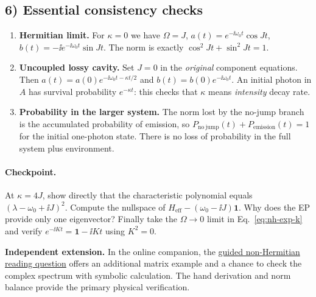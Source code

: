 \subsection*{6) Essential consistency checks}
\begin{enumerate}
\item \textbf{Hermitian limit.}
For $\kappa=0$ we have $\Omega=J$,
$a(t)=e^{-\ii\omega_0t}\cos Jt$,
$b(t)=-\ii e^{-\ii\omega_0t}\sin Jt$.
The norm is exactly $\cos^2 Jt+\sin^2 Jt=1$.
\item \textbf{Uncoupled lossy cavity.}
Set $J=0$ in the \emph{original} component equations.
Then $a(t)=a(0)e^{-\ii\omega_0t-\kappa t/2}$
and $b(t)=b(0)e^{-\ii\omega_0t}$.
An initial photon in $A$ has survival probability
$e^{-\kappa t}$: this checks that $\kappa$ means
\emph{intensity} decay rate.
\item \textbf{Probability in the larger system.}
The norm lost by the no-jump branch is the accumulated
probability of emission, so
$P_{\mathrm{no\ jump}}(t)+P_{\mathrm{emission}}(t)=1$
for the initial one-photon state. There is no loss of
probability in the full system plus environment.
\end{enumerate}
\paragraph{Checkpoint.}
At $\kappa=4J$, show directly that the characteristic
polynomial equals $(\lambda-\omega_0+\ii J)^2$.
Compute the nullspace of
$H_{\mathrm{eff}}-(\omega_0-\ii J)\mathbf1$.
Why does the EP provide only one eigenvector?
Finally take the $\Omega\to0$ limit in
Eq.~\eqref{eq:nh-exp-k} and verify
$e^{-\ii Kt}=\mathbf1-\ii Kt$ using $K^2=0$.

\noindent\textbf{Independent extension.}
In the online companion, the
\href{https://github.com/KangqiaoLiu/advanced-quantum-mechanics-lecture-note/blob/main/companion/reading.html#IC-01-09}
{guided non-Hermitian reading question}
offers an additional matrix example and a chance to
check the complex spectrum with symbolic calculation.
The hand derivation and norm balance provide the primary
physical verification.
